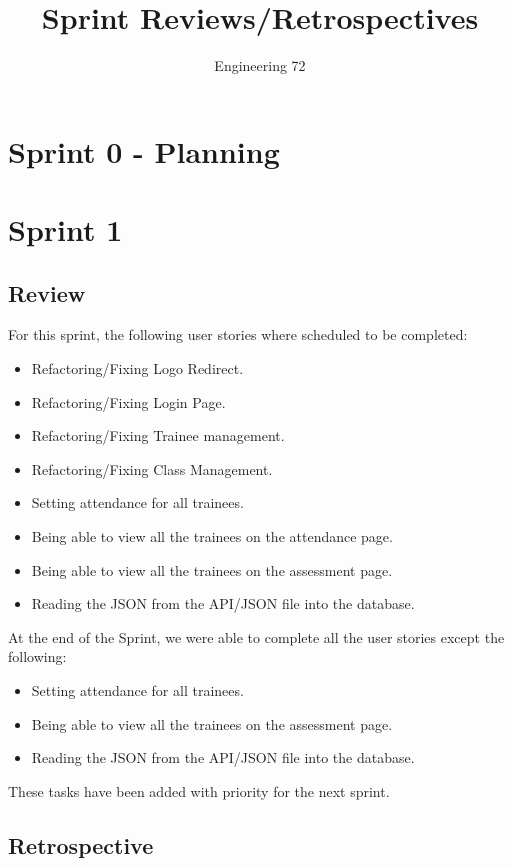 \documentclass[]{report}
\title{Sprint Reviews/Retrospectives}
\author{Engineering 72}
\begin{document}
	\maketitle
	
	\tableofcontents
	
	\section*{Sprint 0 - Planning}
	\section*{Sprint 1}
		\subsection*{Review}
			For this sprint, the following user stories where scheduled to be completed:
			\begin{itemize}
				\item Refactoring/Fixing Logo Redirect.
				\item Refactoring/Fixing Login Page.
				\item Refactoring/Fixing Trainee management.
				\item Refactoring/Fixing Class Management.
				\item Setting attendance for all trainees.
				\item Being able to view all the trainees on the attendance page.
				\item Being able to view all the trainees on the assessment page.
				\item Reading the JSON from the API/JSON file into the database.
			\end{itemize}
			At the end of the Sprint, we were able to complete all the user stories except the following:
			\begin{itemize}
				\item Setting attendance for all trainees.
				\item Being able to view all the trainees on the assessment page.
				\item Reading the JSON from the API/JSON file into the database.
			\end{itemize}
			These tasks have been added with priority for the next sprint.
		\subsection*{Retrospective}
\end{document}
